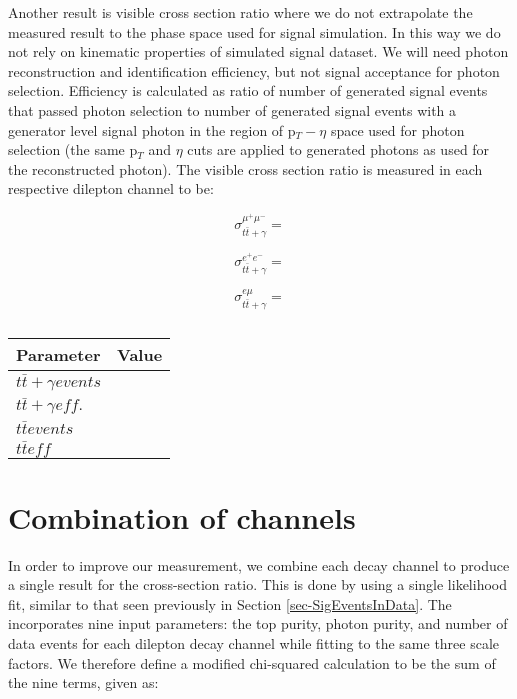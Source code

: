 Another result is visible cross section ratio where we do not extrapolate the measured result to the phase space used for signal simulation. In this way we do not rely on kinematic properties of simulated signal dataset. We will need photon reconstruction and identification efficiency, but not signal acceptance for photon selection. Efficiency is calculated as ratio of number of generated signal events that passed photon selection to number of generated signal events with a generator level signal photon in the region of p$_T - \eta$ space used for photon selection (the same p$_T$ and $\eta$ cuts are applied to generated photons as used for the reconstructed photon). The visible cross section ratio is measured in each respective dilepton channel to be:

\begin{equation}
	\sigma_{t\bar{t}+\gamma}^{\mu^+\mu^-} = 
\end{equation}

\begin{equation}
	\sigma_{t\bar{t}+\gamma}^{e^+e^-} = 
\end{equation}

\begin{equation}
	\sigma_{t\bar{t}+\gamma}^{e\mu} = 
\end{equation}

\begin{table}
\centering
\begin{tabular}{|l|l|}
\hline
	\textbf{Parameter} & \textbf{Value} \\
\hline
	$t\bar{t}+\gamma events$ & \\
	$t\bar{t}+\gamma eff.$ & \\
	$t\bar{t} events$ & \\
	$t\bar{t} eff$ & \\
\hline
\end{tabular}
\caption{}
\end{table}	

\section{Combination of channels} \label{sec-CombinationOfChannels}

In order to improve our measurement, we combine each decay channel to produce a single result for the cross-section ratio. This is done by using a single likelihood fit, similar to that seen previously in Section \ref{sec-SigEventsInData}. The incorporates nine input parameters: the top purity, photon purity, and number of data events for each dilepton decay channel while fitting to the same three scale factors. We therefore define a modified chi-squared calculation to be the sum of the nine terms, given as:

